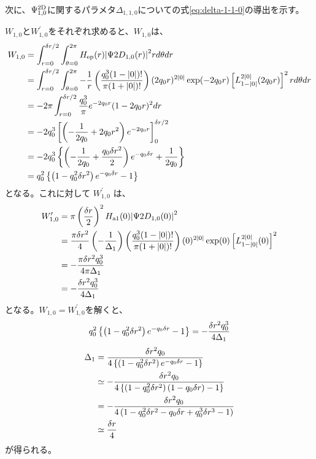 \documentclass[fontsize=11pt]{jlreq}
\begin{document}
次に、$\Psi^{\mathrm{2D}}_{1,0}$に関するパラメタ$\Delta_{1,1,0}$についての式\eqref{eq:delta-1-1-0}の導出を示す。

$W_{1,0}$と$W_{1,0}^\prime$をそれぞれ求めると、$W_{1,0}$は、
\begin{align}
  W_{1,0}
   &= \int_{r=0}^{\delta r/2}\int_{\theta=0}^{2\pi}
      H_{\mathrm{ep}}(r){\left| \Psi2D_{1,0}(r) \right|}^2rd\theta dr\notag\\
   &= \int_{r=0}^{\delta r/2}\int_{\theta=0}^{2\pi}
      -\frac{1}{r}\left(\frac{q_0^3(1-{\left| 0 \right|})!}{\pi(1+{\left| 0 \right|})!}\right)
      (2q_0r)^{2{\left| 0 \right|}}\exp(-2q_0r)
      \left[L_{1-{\left| 0 \right|}}^{2{\left| 0 \right|}}(2q_0r)\right]^2 rd\theta dr\notag\\
   &= -2\pi\int_{r=0}^{\delta r/2}\frac{q_0^3}{\pi}e^{-2q_0r}(1-2q_0r)^2dr\notag\\
   &= -2q_0^3\left[\left(-\frac{1}{2q_0}+2q_0r^2\right)e^{-2q_0r}\right]_{0}^{\delta r/2} \notag\\
   &= -2q_0^3\left\{\left(-\frac{1}{2q_0}+\frac{q_0\delta r^2}{2}\right)e^{-q_0\delta r}+\frac{1}{2q_0}\right\}\notag\\
   &= q_0^2\left\{\left(1-q_0^2\delta r^2\right)e^{-q_0\delta r}-1\right\}
\end{align}
となる。これに対して $W_{1,0}^\prime$ は、
\begin{align}
    W_{1,0}^\prime
    &=\pi\left(\frac{\delta r}{2}\right)^2
         H_{\mathrm{a1}}(0){\left| \Psi2D_{1,0}(0) \right|}^2\notag\\
    &=\frac{\pi\delta r^2}{4}\left(-\frac{1}{\Delta_1}\right)
    \left(\frac{q_0^3(1-{\left| 0 \right|})!}{\pi(1+{\left| 0 \right|})!}\right)
    (0)^{2{\left| 0 \right|}}\exp(0)\left[L_{1-{\left| 0 \right|}}^{2{\left| 0 \right|}}(0)\right]^2\notag\\
    &= -\frac{\pi\delta r^2q_0^3}{4\pi\Delta_1}\notag\\
    &= -\frac{\delta r^2q_0^3}{4\Delta_1}
\end{align}
となる。$W_{1,0}=W_{1,0}^\prime$を解くと、
\begin{equation}
q_0^2\left\{\left(1-q_0^2\delta r^2\right)e^{-q_0\delta r}-1\right\}
=-\frac{\delta r^2q_0^3}{4\Delta_1}
\end{equation}
\begin{align}
\Delta_1&=\frac{\delta r^2q_0}{4\left\{\left(1-q_0^2\delta r^2\right)e^{-q_0\delta r}-1\right\}}\notag\\
&\simeq-\frac{\delta r^2q_0}{4\left\{\left(1-q_0^2\delta r^2\right)(1-q_0\delta r)-1\right\}}\notag\\
&=-\frac{\delta r^2q_0}{4\left(1-q_0^2\delta r^2-q_0\delta r+q_0^3\delta r^3-1\right)}\notag\\
&\simeq\frac{\delta r}{4}
\end{align}
が得られる。
\end{document}
